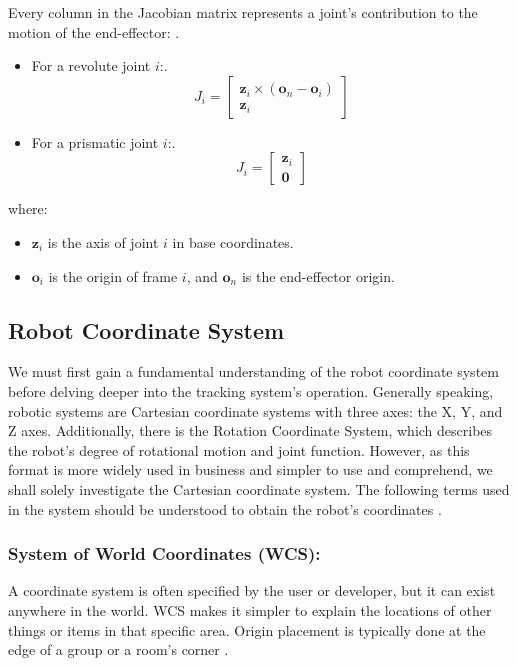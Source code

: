 \documentclass[12pt]{article}
\begin{document}
Every column in the Jacobian matrix represents a joint's contribution to the motion of the end-effector: \cite{ref19}.
\begin{itemize}
    \item For a revolute joint $i$:\cite{ref19}.
    \[
        J_i = \begin{bmatrix}
            \mathbf{z}_i \times (\mathbf{o}_n - \mathbf{o}_i)\\
            \mathbf{z}_i 
        \end{bmatrix}
    \]
    \item For a prismatic joint $i$:\cite{ref19}.
    \[
        J_i = \begin{bmatrix} 
            \mathbf{z}_i \\
            \mathbf{0}
        \end{bmatrix}
    \]
\end{itemize}
where:
\begin{itemize}
    \item $\mathbf{z}_i$ is the axis of joint $i$ in base coordinates.
    \item $\mathbf{o}_i$ is the origin of frame $i$, and $\mathbf{o}_n$ is the end-effector origin.
\end{itemize}

\subsection{Robot Coordinate System} 
We must first gain a fundamental understanding of the robot coordinate system before delving deeper into the tracking system's operation. Generally speaking, robotic systems are Cartesian coordinate systems with three axes: the X, Y, and Z axes. Additionally, there is the Rotation Coordinate System, which describes the robot's degree of rotational motion and joint function. However, as this format is more widely used in business and simpler to use and comprehend, we shall solely investigate the Cartesian coordinate system. The following terms used in the system should be understood to obtain the robot's coordinates \cite{ref24}.

\subsubsection{System of World Coordinates (WCS):}
A coordinate system is often specified by the user or developer, but it can exist anywhere in the world. WCS makes it simpler to explain the locations of other things or items in that specific area. Origin placement is typically done at the edge of a group or a room's corner \cite{ref24}.\\
\end{document}
